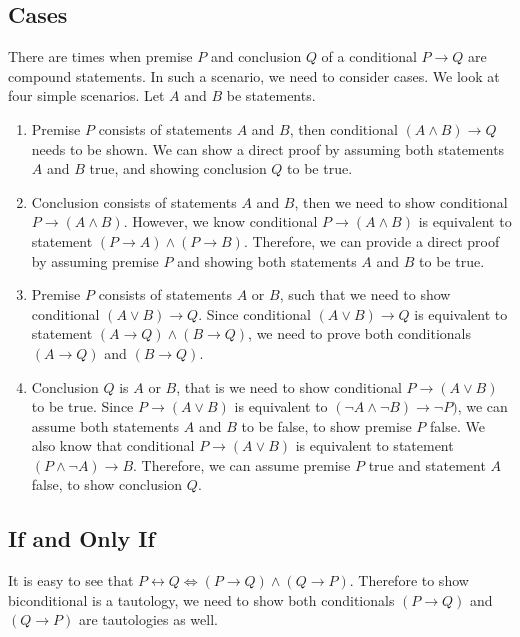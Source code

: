 \documentclass[a4paper,english,12pt]{article}
\begin{document}
\subsection{Cases}
There are times when premise $P$ and conclusion $Q$ of a conditional $P \rightarrow Q$ are compound statements. In such a scenario, we need to consider cases. We look at four simple scenarios. Let $A$ and $B$ be statements.
\begin{enumerate}[i]
\item Premise $P$ consists of statements $A$ and $B$, then conditional $(A \wedge B) \rightarrow Q$ needs to be shown. We can show a direct proof by assuming both statements $A$ and $B$ true, and showing conclusion $Q$ to be true.
\item Conclusion consists of statements $A$ and $B$, then we need to show conditional $P \rightarrow (A \wedge B)$. However, we know conditional $P \rightarrow (A \wedge B)$ is equivalent to statement $(P \rightarrow A)  \wedge (P \rightarrow B)$. Therefore, we can provide a direct proof by assuming premise $P$ and showing both statements $A$ and $B$ to be true.
\item Premise $P$ consists of statements $A$ or $B$, such that we need to show conditional $(A \vee B) \rightarrow Q$. Since conditional $(A \vee B) \rightarrow Q$ is equivalent to statement $(A \rightarrow Q) \wedge (B \rightarrow Q)$, we need to prove both conditionals $(A \rightarrow Q)$ and $(B \rightarrow Q)$.
\item Conclusion $Q$ is $A$ or $B$, that is we need to show conditional $P \rightarrow (A \vee B)$ to be true. Since $P \rightarrow (A \vee B)$ is equivalent to $(\neg A \wedge \neg B) \rightarrow \neg P)$,  we can assume both  statements $A$ and $B$ to be false, to show premise $P$ false. We also know that conditional $P \rightarrow (A \vee B)$ is equivalent to statement $(P\wedge \neg A) \rightarrow B$. Therefore, we can assume premise $P$ true and statement $A$ false, to show conclusion $Q$.
\end{enumerate}
\subsection{If and Only If}
It is easy to see that $P \leftrightarrow Q \Leftrightarrow (P \rightarrow Q)\wedge(Q \rightarrow P)$. Therefore to show biconditional is a tautology, we need to show both conditionals $(P \rightarrow Q)$ and $(Q \rightarrow P)$ are tautologies as well.
\end{document}
